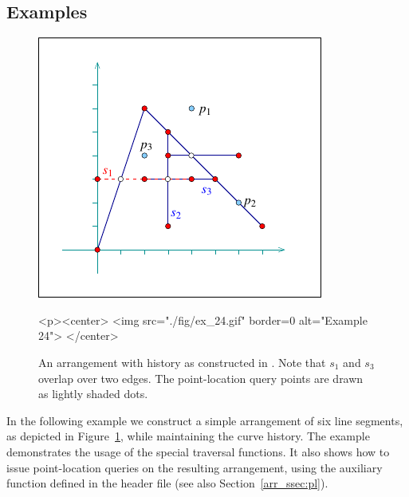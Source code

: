 \subsection{Examples}
\label{arr_ssec:arr_hist_ex}
%
\begin{figure}[!htp]
\begin{ccTexOnly}
  \begin{center}
  \includegraphics{Arrangement_2/fig/ex_24}
  \end{center}
\end{ccTexOnly}
\begin{ccHtmlOnly}
  <p><center>
  <img src="./fig/ex_24.gif" border=0 alt="Example 24">
  </center>
\end{ccHtmlOnly}
\caption{An arrangement with history as constructed in
. 
Note that $s_1$ and $s_3$ overlap over two edges. The point-location query
points are drawn as lightly shaded dots.}
\label{arr_fig:ex_24}
\end{figure}

In the following example we construct a simple arrangement of six line
segments, as depicted in Figure~\ref{arr_fig:ex_24}, while maintaining 
the curve history. The example demonstrates the usage of the special
traversal functions. It also shows how to issue point-location queries
on the resulting arrangement, using the auxiliary function 
 defined in the header file 
 (see also Section~\ref{arr_ssec:pl}).


